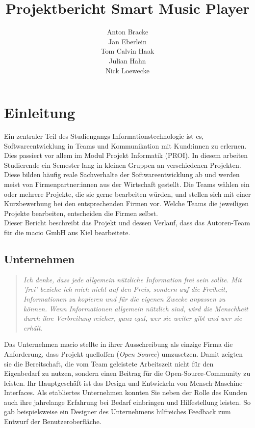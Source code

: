 \documentclass[10pt, a4paper]{article}
\title{Projektbericht Smart Music Player}
\author{Anton Bracke\\Jan Eberlein\\Tom Calvin Haak\\Julian Hahn\\Nick Loewecke}
\begin{document}
\maketitle
\newpage
\tableofcontents
\newpage



\section{Einleitung}
Ein zentraler Teil des Studiengangs \glqq Informationstechnologie\grqq{} ist es, Softwareentwicklung in Teams und Kommunikation mit Kund:innen zu erlernen. \cite{Qualifikationsziele_Informationstechnologie}
Dies passiert vor allem im Modul \glqq Projekt Informatik (PROI)\grqq{}.
In diesem arbeiten Studierende ein Semester lang in kleinen Gruppen an verschiedenen Projekten.
Diese bilden häufig reale Sachverhalte der Softwareentwicklung ab und werden meist von Firmenpartner:innen aus der Wirtschaft gestellt.
Die Teams wählen ein oder mehrere Projekte, die sie gerne bearbeiten würden, und stellen sich mit einer Kurzbewerbung bei den entsprechenden Firmen vor.
Welche Teams die jeweiligen Projekte bearbeiten, entscheiden die Firmen selbst.
\\
Dieser Bericht beschreibt das Projekt und dessen Verlauf, dass das Autoren-Team für die macio GmbH aus Kiel bearbeitete.

\subsection{Unternehmen}
\begin{quote}
  \textit{Ich denke, dass jede allgemein nützliche Information frei sein sollte.
  Mit 'frei' beziehe ich mich nicht auf den Preis, sondern auf die Freiheit, Informationen zu kopieren und für die eigenen Zwecke anpassen zu können.
  Wenn Informationen allgemein nützlich sind, wird die Menschheit durch ihre Verbreitung reicher, ganz egal, wer sie weiter gibt und wer sie erhält.}
  \cite{openSource}
\end{quote}

Das Unternehmen macio stellte in ihrer Ausschreibung als einzige Firma die Anforderung, dass Projekt quelloffen (\textit{Open Source}) umzusetzen.
Damit zeigten sie die Bereitschaft, die vom Team geleistete Arbeitszeit nicht für den Eigenbedarf zu nutzen, sondern einen Beitrag für die Open-Source-Community zu leisten.
Ihr Hauptgeschäft ist das Design und Entwickeln von Mensch-Maschine-Interfaces.
Als etabliertes Unternehmen konnten Sie neben der Rolle des Kunden auch ihre jahrelange Erfahrung bei Bedarf einbringen und Hilfestellung leisten.
So gab beispielsweise ein Designer des Unternehmens hilfreiches Feedback zum Entwurf der Benutzeroberfläche.
\end{document}
